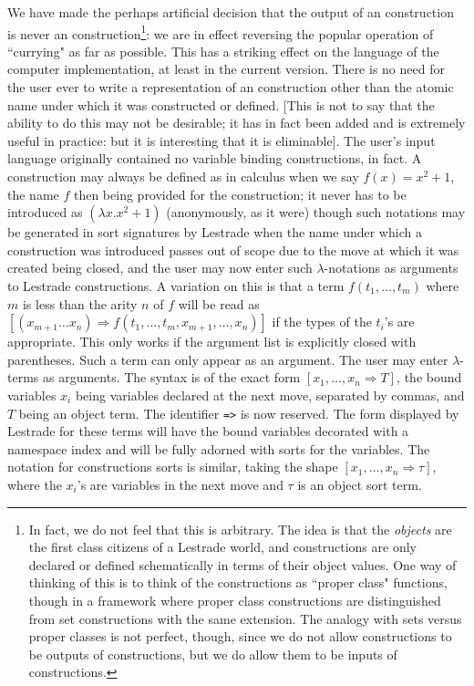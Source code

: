 \documentclass[12pt]{article}
\begin{document}
We have made the perhaps artificial decision that the output of an construction is never an construction\footnote{In fact, we do not feel that this is arbitrary.  The idea is that the {\em objects\/} are the first class citizens of a Lestrade world, and constructions are only declared or defined schematically in terms of their object values.  One way of thinking of this is to think of the constructions as ``proper class" functions, though in a framework where proper class constructions are distinguished from set constructions with the same extension.  The analogy with sets versus proper classes is  not perfect, though, since we do not allow constructions to be outputs of constructions, but we do allow them to be inputs of constructions.}:  we are in effect reversing the popular operation of ``currying" as far as possible.
This has a striking effect on the language of the computer implementation, at least in the current version.  There is no need for the user ever to write a representation of
an construction other than the atomic name under which it was constructed or defined.  [This is not to say that the ability to do this may not be desirable; it has in fact been added and is extremely useful in practice:  but it is interesting that it is eliminable].  The user's input language originally contained no variable binding constructions, in fact.   A construction may always be defined as in calculus when we say $f(x)=x^2+1$, the name $f$ then being provided for the construction; it never has to be introduced as $(\lambda x.x^2+1)$ (anonymously, as it were) though such notations may be generated in sort signatures by
Lestrade when the name under which a construction was introduced passes out of scope due to the move at which it was created being closed, and the user may now enter such $\lambda$-notations as arguments to Lestrade constructions.  A variation on this is that a term $f(t_1,\ldots,t_m)$ where $m$ is less than the arity $n$ of $f$ will be read as $[(x_{m+1}\ldots x_n) \Rightarrow f(t_1,\ldots,t_m,x_{m+1},\dots,x_n)]$ if the types of the $t_i$'s are appropriate.  This only works if the argument list is explicitly closed with parentheses.  Such a term can only appear as an argument.  The user may enter $\lambda$-terms as arguments.  The syntax is of the exact form $[x_1,\ldots,x_n \Rightarrow T]$, the bound variables $x_i$ being variables declared at the next move, separated by commas, and $T$ being an object term.  The identifier {\tt =>} is now reserved.  The form displayed by Lestrade for these terms will have the bound variables decorated with a namespace index and will be fully adorned with sorts for the variables.  The notation for constructions sorts is similar, taking the shape $[x_1,\ldots,x_n \Rightarrow \tau]$, where the $x_i$'s are variables in the next move and $\tau$ is an object sort term.
\end{document}
